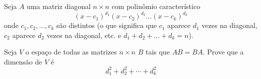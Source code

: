 Seja \(A\) uma matriz diagonal \(n \times n\) com polinômio característico
\[(x-c_1)^{d_1}(x-c_2)^{d_2}\ldots (x-c_k)^{d_k}\]
onde \(c_1, c_2, \ldots, c_k\) são distintos (o que significa que \(c_1\) aparece \(d_1\) vezes na diagonal, \(c_2\) aparece \(d_2\) vezes na diagonal, etc. e \(d_1+d_2+\ldots + d_k=n\)).

Seja \(V\) o espaço de todas as matrizes \(n\times n\) \(B\) tais que \(AB=BA\).
Prove que a dimensão de \(V\) é
\[d_1^2+d_2^2+\cdots + d_k^2\]
